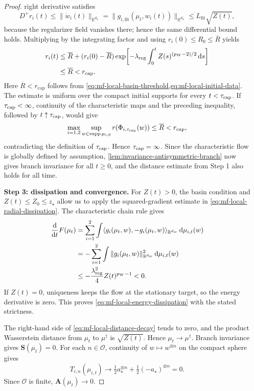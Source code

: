 \begin{proof}
right derivative satisfies
\[
 D^+r_i(t)\le\|\dot w_i(t)\|_{\mathbb R^{d_w}}
 =\|g_{i,\mathrm{fit}}(\mu_t,w_i(t))\|_{\mathbb R^{d_w}}
 \le L_{\mathrm{fit}}\sqrt{Z(t)},
\]
because the regularizer field vanishes there; hence the same differential
bound holds. Multiplying by the integrating factor and using
\(r_i(0)\le R_0\le\overline R\) yields
\[
\begin{aligned}
 r_i(t)
 &\le\overline R+(r_i(0)-\overline R)
 \exp\!\left[-\lambda_{\mathrm{reg}}\int_0^t
       Z(s)^{(p_W-2)/2}\,\dd s\right]\\
 &\le\overline R<r_{\mathrm{cap}}.
\end{aligned}
\]
Here \(\overline R<r_{\mathrm{cap}}\) follows from
\cref{eq:mf-local-basin-threshold,eq:mf-local-initial-data}. The estimate is
uniform over the compact initial supports for every $t<\tau_{\rm cap}$.
If $\tau_{\rm cap}<\infty$, continuity of the characteristic maps and the
preceding inequality, followed by $t\uparrow\tau_{\rm cap}$, would give
\[
 \max_{i=1,2}\sup_{w\in\operatorname{supp}\mu_{i,0}}
 r(\Phi_{i,\tau_{\rm cap}}(w))
 \le\overline R<r_{\rm cap},
\]
contradicting the definition of $\tau_{\rm cap}$. Hence
$\tau_{\rm cap}=\infty$.
Since the characteristic flow is globally defined by assumption,
\cref{lem:invariance-antisymmetric-branch} now gives branch invariance for all
\(t\ge0\), and the distance estimate from Step 1 also holds for all time.

\par\noindent\textbf{Step 3: dissipation and convergence.}
For \(Z(t)>0\), the basin condition and \(Z(t)\le Z_0\le z_\star\) allow us
to apply the squared-gradient estimate in
\cref{eq:mf-local-radial-dissipation}. The characteristic chain rule gives
\[
\begin{aligned}
 \frac{\dd}{\dd t}F(\mu_t)
 &=\sum_{i=1}^2\int
   \langle g_i(\mu_t,w),-g_i(\mu_t,w)\rangle_{\mathbb R^{d_w}}
   \,\dd\mu_{i,t}(w)\\
 &=-\sum_{i=1}^2\int
   \|g_i(\mu_t,w)\|_{\mathbb R^{d_w}}^2\,\dd\mu_{i,t}(w)\\
 &\le-\frac{\lambda_{\mathrm{reg}}^2}{4}Z(t)^{p_W-1}<0.
\end{aligned}
\]
If \(Z(t)=0\), uniqueness keeps the flow at the stationary target, so the
energy derivative is zero. This proves
\cref{eq:mf-local-energy-dissipation} with the stated strictness.

The right-hand side of \cref{eq:mf-local-distance-decay} tends to zero, and
the product Wasserstein distance from \(\mu_t\) to \(\mu^\dagger\) is
\(\sqrt{Z(t)}\). Hence \(\mu_t\to\mu^\dagger\). Branch invariance gives
\(\mathbf S(\mu_t)=0\). For each \(n\in\mathcal O\), continuity of
\(w\mapsto w^{\otimes n}\) on the compact sphere gives
\[
 T_{i,n}(\mu_{i,t})\longrightarrow
 \tfrac12a_\star^{\otimes n}+\tfrac12(-a_\star)^{\otimes n}=0.
\]
Since \(\mathcal O\) is finite, \(\mathbf A(\mu_t)\to0\).
\end{proof}
